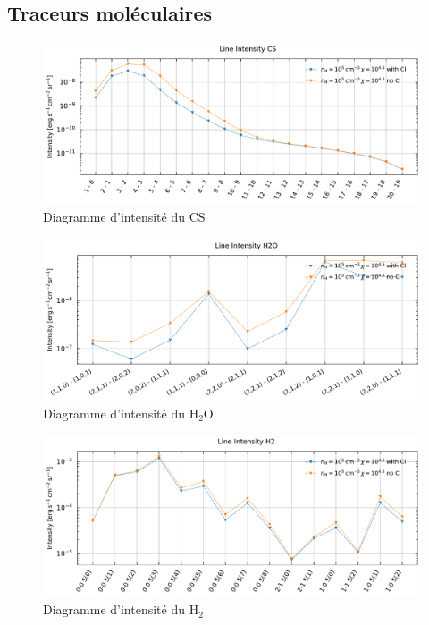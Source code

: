 \begin{appendices}
\clearpage
\subsection*{Traceurs moléculaires}


\begin{figure}[!h]
        \centering \includegraphics[trim = {0 0 0 1cm},clip,width=1\textwidth]{figure/Cl/gridModelEmiss/I_comp_CS.pdf}
        \caption{Diagramme d'intensité du $\mathrm{CS}$}
        \label{fig:cl:emiss:CS}
\end{figure}

\begin{figure}[!h]
        \centering \includegraphics[trim = {0 0 0 1cm},clip,width=1\textwidth]{figure/Cl/gridModelEmiss/I_comp_H2O.pdf}
        \caption{Diagramme d'intensité du $\mathrm{H}_2\mathrm{O}$}
        \label{fig:cl:emiss:H2O}
\end{figure}

\begin{figure}[!h]
        \centering \includegraphics[trim = {0 0 0 1cm},clip,width=1\textwidth]{figure/Cl/gridModelEmiss/I_comp_H2.pdf}
        \caption{Diagramme d'intensité du $\mathrm{H}_2$}
        \label{fig:cl:emiss:H2}
\end{figure}


\end{appendices}
